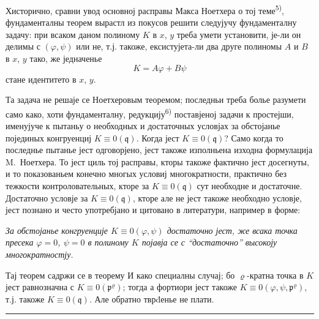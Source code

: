 \documentclass[11pt]{article}
\theoremstyle{plain}
\begin{document}
Хисторично, сравни увод основној расправы Макса Ноетхера о тој
теме\textsuperscript{5)}, фундаменталны теорем вырастл из покусов
решити следујучу фундаменталну задачу: при всаком даном полиному
$K$ в $x$, $y$ треба умети установити, је-ли он делимы с
$(\varphi, \psi)$ или не, т.ј. такоже, ексистујета-ли два друге
полиномы $A$ и $B$ в $x$, $y$ тако, же једначенье
\[
K = A\varphi + B\psi
\]
стане идентитето в $x$, $y$.

Та задача не решаје се Ноетхеровым теоремом; последньи треба болье
разумети само како, хоти фундаменталну, редукцију\textsuperscript{6)}
поставјеној задачи к простејши, именујуче к пытаньу о необходных и
достаточных условјах за обстојанье појединых конгруенциј
$K \equiv 0(\mathfrak{q})$. Когда јест $K \equiv 0(\mathfrak{q})$?
Само когда то последнье пытанье јест одговорјено, јест такоже
изполньена изходна формулација M.\ Ноетхера. То јест циль тој
расправы, кторы такоже фактично јест досегнуты, и то показованьем
конечно многых условиј многократности, практично без тежкости
контроловательных, кторе за $K \equiv 0(\mathfrak{q})$ сут
необходне и достаточне. Достаточно условје за
$K \equiv 0(\mathfrak{q})$, кторе але не јест такоже необходно
условје, јест познано и често употребјано и цитовано в литератури,
например в форме:

\smallskip
\textit{За обстојанье конгруенције $K \equiv 0(\varphi, \psi)$
достаточно јест, же всака точка пресека $\varphi = 0$, $\psi = 0$
в полиному $K$ појавја се с ``достаточно'' высокоју многократностју.}

\smallskip
Тај теорем садржи се в теорему И како специалны случај; бо
$\varrho$-кратна точка в $K$ јест равнозначна с
$K \equiv 0(\mathfrak{p}^{\varrho})$; тогда а фортиори јест такоже
$K \equiv 0(\varphi, \psi, \mathfrak{p}^{\varrho})$, т.ј. такоже
$K \equiv 0(\mathfrak{q})$. Але обратно тврđенье не плати.

\vspace{0.5em}
\noindent\rule{\textwidth}{0.4pt}
\vspace{0.3em}
\end{document}
